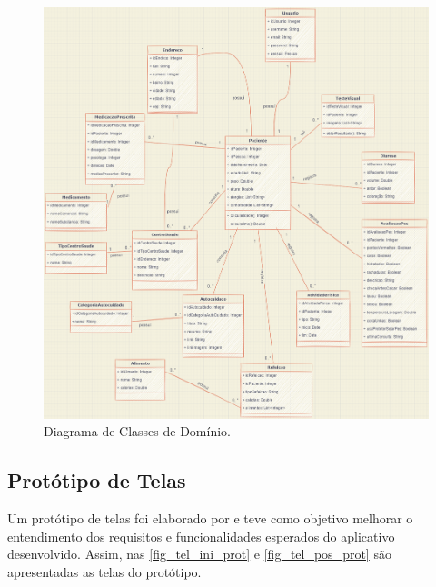 \begin{figure}[htb]
    \caption{\label{fig_class_dom}Diagrama de Classes de Domínio.}
    \begin{center}
        \includegraphics[scale=0.35]{Imagens/proposta/diagrama_classes.png}
    \end{center}
\end{figure}

\newpage

\subsection{Protótipo de Telas}

Um protótipo de telas foi elaborado por  e teve como objetivo
melhorar o entendimento dos requisitos e funcionalidades esperados do aplicativo desenvolvido.
Assim, nas \autoref{fig_tel_ini_prot} e \autoref{fig_tel_pos_prot} são apresentadas as telas do protótipo.

